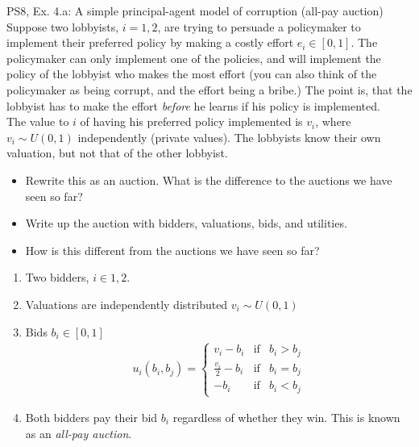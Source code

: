 \begin{frame}{PS8, Ex. 4.a: A simple principal-agent model of corruption (all-pay auction)}
    Suppose two lobbyists, $i = 1, 2$, are trying to persuade a policymaker to implement their preferred policy by making a costly effort $e_i\in[0, 1]$. The policymaker can only implement one of the policies, and will implement the policy of the lobbyist who makes the most effort (you can also think of the policymaker as being corrupt, and the effort being a bribe.) The point is, that the lobbyist has to make the effort \textit{before} he learns if his policy is implemented.\\\smallskip
    The value to $i$ of having his preferred policy implemented is $v_i$, where $v_i\sim U(0, 1)$ independently (private values). The lobbyists know their own valuation, but not that of the other lobbyist.
    \vspace{-4pt}
    \begin{itemize}
      \item[(a)] Rewrite this as an auction. What is the difference to the auctions we have seen so far?
    \end{itemize}
    \vspace{-8pt}
    \begin{multicols}{2}
      \begin{itemize}
        \item[Step 1:] Write up the auction with bidders, valuations, bids, and utilities.
        \item[Step 2:] How is this different from the auctions we have seen so far?
      \end{itemize}
      \vfill\null\columnbreak
      \begin{enumerate}
        \item Two bidders, $i\in1,2$.
        \item[] Valuations are independently distributed $v_i\sim U(0, 1)$
        \item[] Bids $b_i\in[0,1]$ \vspace{-6pt}
        \begin{align*}
          u_i(b_i,b_j)=\left\{\begin{array}{lcl}
            v_i-b_i           & \text{if} & b_i>b_j \\
            \frac{v_i}{2}-b_i & \text{if} & b_i=b_j \\
            -b_i              & \text{if} & b_i<b_j
          \end{array}\right.
        \end{align*}
        \item \vspace{-6pt} Both bidders pay their bid $b_i$ regardless of whether they win. This is known as an \textit{all-pay auction}.
      \end{enumerate}
      \vfill\null
    \end{multicols}
\end{frame}



